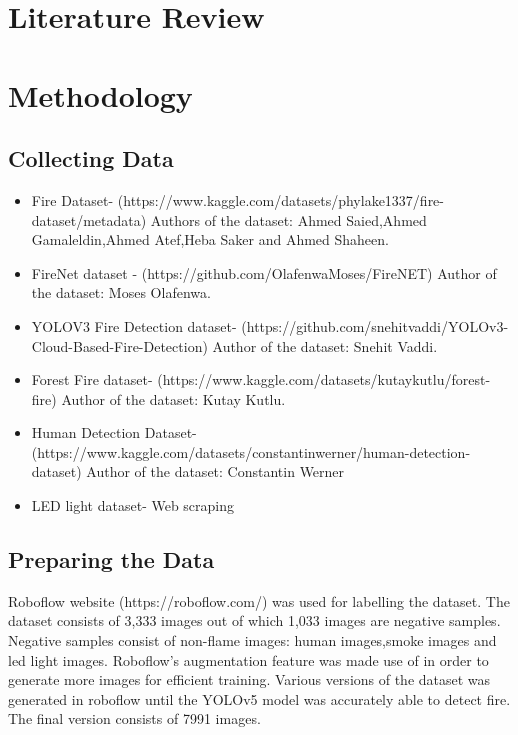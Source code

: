 \documentclass[conference]{IEEEtran}
\begin{document}
\section{Literature Review}


\section{Methodology}
\subsection{Collecting Data}\label{AA}
\begin{itemize}
\item Fire Dataset- (https://www.kaggle.com/datasets/phylake1337/fire-dataset/metadata)
Authors of the dataset: Ahmed Saied,Ahmed Gamaleldin,Ahmed Atef,Heba Saker and Ahmed Shaheen.
\item FireNet dataset - (https://github.com/OlafenwaMoses/FireNET) Author of the dataset: Moses Olafenwa.
\item YOLOV3 Fire Detection dataset- (https://github.com/snehitvaddi/YOLOv3-Cloud-Based-Fire-Detection) Author of the dataset: Snehit Vaddi.
\item Forest Fire dataset- (https://www.kaggle.com/datasets/kutaykutlu/forest-fire) Author of the dataset: Kutay Kutlu.
\item Human Detection Dataset- (https://www.kaggle.com/datasets/constantinwerner/human-detection-dataset) Author of the dataset: Constantin Werner
\item LED light dataset- Web scraping
\end{itemize}

\subsection{Preparing the Data}
Roboflow website (https://roboflow.com/) was used for labelling the dataset. The dataset consists of 3,333 images out of which 1,033 images are negative samples. Negative samples consist of non-flame images: human images,smoke images and led light images. Roboflow's augmentation feature was made use of in order to generate more images for efficient training. Various versions of the dataset was generated in roboflow until the YOLOv5 model was accurately able to detect fire. The final version consists of 7991 images.
\end{document}
